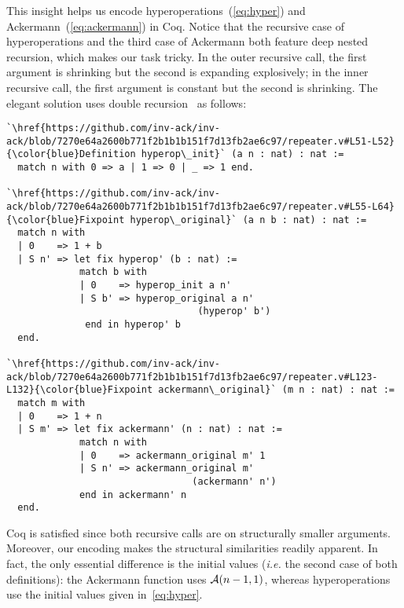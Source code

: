 This insight helps us encode hyperoperations~(\ref{eq:hyper}) and
Ackermann~(\ref{eq:ackermann}) in Coq.  
Notice that the recursive case of hyperoperations and
the third case of Ackermann both feature deep nested recursion, 
which makes our task tricky. 
In the outer recursive call, the first argument is shrinking
but the second is expanding explosively; in the inner recursive call, the first argument is
constant but the second is shrinking. The elegant solution uses double recursion~\cite{bertotcast} as follows:
\begin{lstlisting}
`\href{https://github.com/inv-ack/inv-ack/blob/7270e64a2600b771f2b1b1b151f7d13fb2ae6c97/repeater.v#L51-L52}{\color{blue}Definition hyperop\_init}` (a n : nat) : nat :=
  match n with 0 => a | 1 => 0 | _ => 1 end.

`\href{https://github.com/inv-ack/inv-ack/blob/7270e64a2600b771f2b1b1b151f7d13fb2ae6c97/repeater.v#L55-L64}{\color{blue}Fixpoint hyperop\_original}` (a n b : nat) : nat :=
  match n with
  | 0    => 1 + b
  | S n' => let fix hyperop' (b : nat) :=
             match b with
             | 0    => hyperop_init a n'
             | S b' => hyperop_original a n' 
                                  (hyperop' b')
              end in hyperop' b
  end.

`\href{https://github.com/inv-ack/inv-ack/blob/7270e64a2600b771f2b1b1b151f7d13fb2ae6c97/repeater.v#L123-L132}{\color{blue}Fixpoint ackermann\_original}` (m n : nat) : nat :=
  match m with
  | 0    => 1 + n
  | S m' => let fix ackermann' (n : nat) : nat :=
             match n with
             | 0    => ackermann_original m' 1
             | S n' => ackermann_original m' 
                                 (ackermann' n')
             end in ackermann' n
  end.
\end{lstlisting}
Coq is satisfied since both recursive calls are on structurally smaller arguments.
Moreover, our encoding makes the structural similarities
 readily apparent.  In fact, the only essential difference is the initial values
(\emph{i.e.} the second case of both definitions): the Ackermann function uses $\mathcal{A}(n-1,1)$, whereas
hyperoperations use the initial values given in~\eqref{eq:hyper}.

